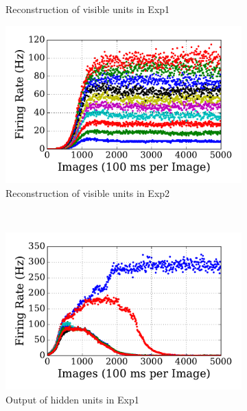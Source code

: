 \begin{figure}
\begin{subfigure}[t]{0.48\textwidth}
		\caption{Reconstruction of visible units in Exp1}
	\end{subfigure}
	\begin{subfigure}[t]{0.48\textwidth}
		\includegraphics[width=\textwidth]{pics_sdlm/11_exp_SRBM_Orig_long/exp2_recon_s.pdf}
		\caption{Reconstruction of visible units in Exp2}
	\end{subfigure}\\
	\begin{subfigure}[t]{0.48\textwidth}
		\includegraphics[width=\textwidth]{pics_sdlm/11_exp_SRBM_Orig_long/exp1_hid_s.pdf}
		\caption{Output of hidden units in Exp1}
	\end{subfigure}
	\begin{subfigure}[t]{0.48\textwidth}

\end{subfigure}
\end{figure}
